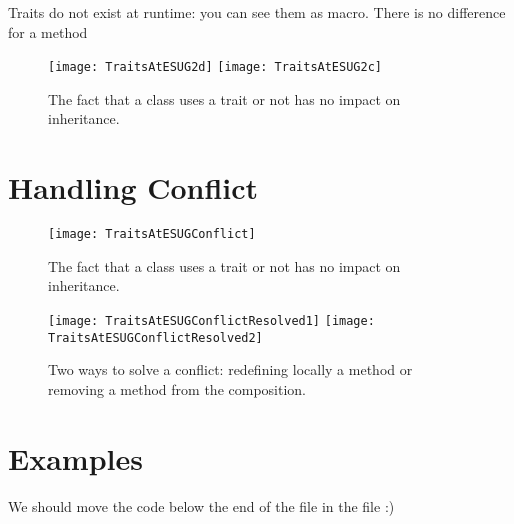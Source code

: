 \documentclass[a4paper,10pt,twoside]{book}
\begin{document}
Traits do not exist at runtime: you can see them as macro. There is no difference for a method 


\begin{figure}[h]
\begin{center}
\texttt{[image: TraitsAtESUG2d]}\hfill
\texttt{[image: TraitsAtESUG2c]}
\caption{The fact that a class uses a trait or not has no impact on inheritance.}
\end{center}
\end{figure}



\section{Handling Conflict}

\begin{figure}[h]
\begin{center}
\texttt{[image: TraitsAtESUGConflict]}
\caption{The fact that a class uses a trait or not has no impact on inheritance.}
\end{center}
\end{figure}


\begin{figure}[h]
\begin{center}
\texttt{[image: TraitsAtESUGConflictResolved1]}\hfill
\texttt{[image: TraitsAtESUGConflictResolved2]}
\caption{Two ways to solve a conflict: redefining locally a method or removing a method from the composition.}
\end{center}
\end{figure}

\section{Examples}

We should move the code below the end of the file in the file :)
\ifx\wholebook\relax\else
   
   
\end{document}
